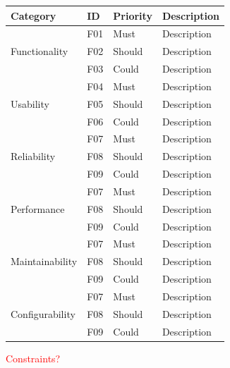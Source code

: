 \documentclass[11pt]{article}
\begin{document}
\begin{tabular}{|m{1in}|m{0.3in}|m{0.6in}|m{4.5in}|}
\hline
\textbf{Category}  & \textbf{ID}  & \textbf{Priority}        & \textbf{Description} \\
\hline\hline
\multirow{3}{*}{Functionality }
 & F01 & Must
 & Description \\  \cline{2-4}
 & F02 & Should
 & Description \\  \cline{2-4}
 & F03 & Could
 & Description \\ \hline

\multirow{3}{*}{Usability }
 & F04 & Must
 & Description \\  \cline{2-4}
 & F05 & Should
 & Description \\  \cline{2-4}
 & F06 & Could
 & Description \\ \hline

\multirow{3}{*}{Reliability }
 & F07 & Must
 & Description \\  \cline{2-4}
 & F08 & Should
 & Description \\  \cline{2-4}
 & F09 & Could
 & Description \\ \hline


\multirow{3}{*}{Performance }
 & F07 & Must
 & Description \\  \cline{2-4}
 & F08 & Should
 & Description \\  \cline{2-4}
 & F09 & Could
 & Description \\ \hline

\multirow{3}{*}{Maintainability}
 & F07 & Must
 & Description \\  \cline{2-4}
 & F08 & Should
 & Description \\  \cline{2-4}
 & F09 & Could
 & Description \\ \hline

\multirow{3}{*}{Configurability}
 & F07 & Must
 & Description \\  \cline{2-4}
 & F08 & Should
 & Description \\  \cline{2-4}
 & F09 & Could
 & Description \\ \hline
\end{tabular}

\textcolor{red}{Constraints?}

\clearpage
\end{document}
